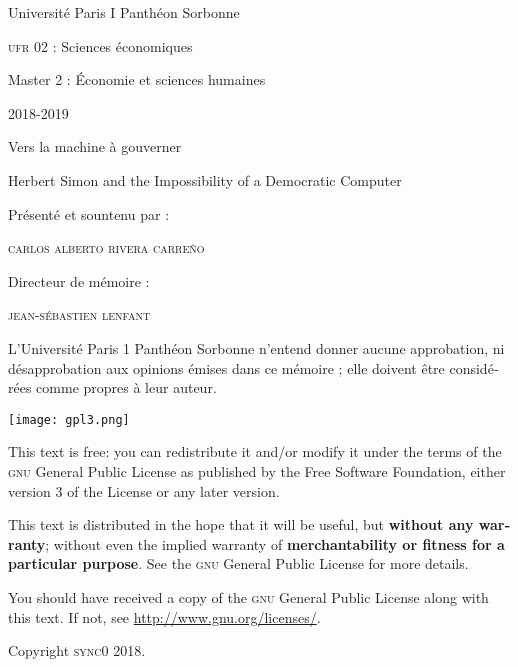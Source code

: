\documentclass[paper=A4,portrait,twoside=true,twocolumn=true,headinclude=false,footinclude=false,fontsize=10,BCOR=15mm,DIV=13,pagesize=auto,titlepage=firstiscover,mpinclude=true,open=right,chapterprefix=true,numbers=autoendperiod,headsepline=false,parskip=false]{scrbook}
\author{Carlos Alberto Rivera Carreño}
\date{}
\title{}
\theoremstyle{definition}
\begin{document}
\begin{titlepage}
 \centering
 \vspace{4\baselineskip}
\begin{french}
 {\Large Université Paris I Panthéon Sorbonne \par}
 {\Large \textsc{ufr} 02 : Sciences économiques  \par}
 {\large Master 2 : Économie et sciences humaines \par}
 {\large 2018-2019 \par}
\end{french}
 \vspace{2\baselineskip}
 {\huge Vers la machine à gouverner  \par}
 {\Large Herbert Simon and the Impossibility of a Democratic Computer \par}
\vspace*{\fill}
\begin{french}
 {\large Présenté et sountenu par : \par}
\end{french}
 {\large \textsc{carlos alberto rivera carreño}\par}
 \vspace{1\baselineskip}
\begin{french}
 {\large Directeur de mémoire : \par}
\end{french}
 {\large \textsc{jean-sébastien lenfant}\par}
\end{titlepage}

\onecolumn
\pagestyle{empty}

\begin{french}
L'Université Paris 1 Panthéon Sorbonne n'entend donner aucune approbation,
ni désapprobation aux opinions émises dans ce mémoire ; elle doivent être
considérées comme propres à leur auteur. 
\end{french}

\newpage
\vspace*{\fill}
\noindent
\texttt{[image: gpl3.png]}\par
\vspace{1\baselineskip}
\begin{english}
This text is free: you can redistribute it and/or modify it
under the terms of the \textsc{gnu} General Public License as published by
the Free Software Foundation, either version 3 of the License or any later
version.

This text is distributed in the hope that it will be useful, but \textbf{without
any warranty}; without even the implied warranty of \textbf{merchantability or 
fitness for a particular purpose}. See the \textsc{gnu} General 
Public License for more details.

You should have received a copy of the \textsc{gnu} General Public License along
with this text. If not, see \url{http://www.gnu.org/licenses/}.

\vspace{1\baselineskip}
\noindent
Copyright \textcopyright \textsc{sync0} 2018. 
\end{english}
\end{document}
